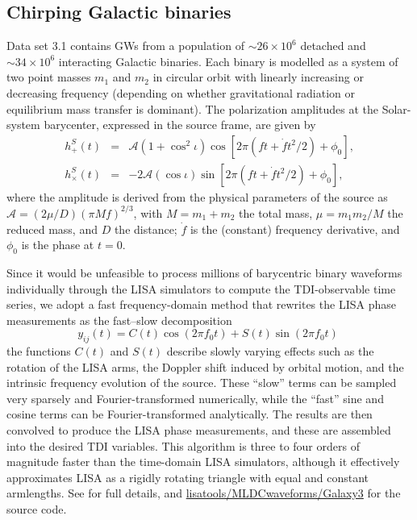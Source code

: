 \documentclass{iopart}
\begin{document}
\subsection{Chirping Galactic binaries}
\label{sec:ch3galaxy}

Data set 3.1 contains GWs from a population of $\sim 26 \times 10^6$ detached and $\sim 34 \times 10^6$ interacting Galactic binaries. Each binary is modelled as a system of two point masses $m_1$ and $m_2$ in circular orbit with linearly increasing or decreasing frequency (depending on whether gravitational radiation or equilibrium mass transfer is dominant). The polarization amplitudes at the Solar-system barycenter, expressed in the source frame, are given by
%
\begin{eqnarray}
h^S_+(t) & = & \mathcal{A} \left(1 + \cos^2{\iota}\right) \cos[2\pi (f t + \dot{f} t^2 / 2) + \phi_0], \\
h^S_\times(t) & = & -2 \mathcal{A} (\cos{\iota}) \sin[2\pi (f t + \dot{f} t^2 / 2) + \phi_0], \nonumber
\end{eqnarray}
%
where the amplitude is derived from the physical parameters of the source as $\mathcal{A} = (2 \mu / D) (\pi M f)^{2/3}$, with $M = m_1 + m_2$ the total mass, $\mu = m_1 m_2 / M $ the reduced mass, and $D$ the distance; $\dot{f}$ is the (constant) frequency derivative, and $\phi_0$ is the phase at $t = 0$.

Since it would be unfeasible to process millions of barycentric binary waveforms individually through the LISA simulators to compute the TDI-observable time series, we adopt a fast frequency-domain method \cite{Cornish:2007if} that rewrites the LISA phase measurements as the fast--slow decomposition
%
\begin{equation}
y_{ij}(t) = C(t) \cos(2 \pi f_0 t) + S(t) \sin(2 \pi f_0 t) \;
\end{equation}
%
the functions $C(t)$ and $S(t)$ describe slowly varying effects such as the rotation of the LISA arms, the Doppler shift induced by orbital motion, and the intrinsic frequency evolution of the source. These ``slow'' terms can be sampled very sparsely and Fourier-transformed numerically, while the ``fast'' sine and cosine terms can be Fourier-transformed analytically. The results are then convolved to produce the LISA phase measurements, and these are assembled into the desired TDI variables. This algorithm is three to four orders of magnitude faster than the time-domain LISA simulators, although it effectively approximates LISA as a rigidly rotating triangle with equal and constant armlengths. See \cite{Cornish:2007if} for full details, and \url{lisatools/MLDCwaveforms/Galaxy3} for the source code.
\end{document}
